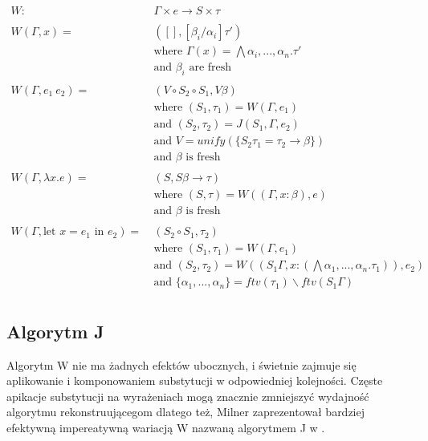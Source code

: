 \documentclass{article}
\begin{document}
\begin{equation}
  \begin{split}
    W :&\ \Gamma\times e \rightarrow S\times\tau \\
    \\
    W(\Gamma,x) =&\  ([],[\beta_i/\alpha_i]\tau') \\
    &\ \text{where } \Gamma(x) = \bigwedge\alpha_i,...,\alpha_n.\tau' \\
    &\ \text{and } \beta_i \text{ are fresh} \\
    \\
    W(\Gamma,e_1\ e_2) =&\  (V\circ S_2\circ S_1,V\beta) \\
    &\ \text{where } (S_1,\tau_1) = W(\Gamma,e_1) \\
    &\ \text{and } (S_2,\tau_2)=J(S_1,\Gamma,e_2) \\
    &\ \text{and } V = unify(\{S_2\tau_1=\tau_2\rightarrow\beta\}) \\
    &\ \text{and } \beta \text{ is fresh} \\
    \\
    W(\Gamma,\lambda x.e) =&\  (S,S\beta\rightarrow\tau) \\
    &\ \text{where } (S,\tau)=W((\Gamma,x:\beta),e) \\
    &\ \text{and } \beta \text{ is fresh} \\
    \\
    W(\Gamma,\text{let }x=e_1\text{ in }e_2) =&\  (S_2\circ S_1,\tau_2) \\
    &\ \text{where } (S_1,\tau_1)=W(\Gamma,e_1) \\
    &\ \text{and } (S_2,\tau_2)=W((S_1\Gamma,x:(\bigwedge\alpha_1,...,\alpha_n.\tau_1)),e_2) \\
    &\ \text{and } \{\alpha_1,...,\alpha_n\}=ftv(\tau_1)\backslash ftv(S_1\Gamma) \\
  \end{split}
\end{equation}

\subsection{Algorytm J}
Algorytm W nie ma żadnych efektów ubocznych, i świetnie zajmuje się aplikowanie i komponowaniem substytucji w odpowiedniej kolejności. Częste apikacje substytucji na wyrażeniach mogą znacznie zmniejszyć wydajność algorytmu rekonstruującegom dlatego też, Milner zaprezentował bardziej efektywną impereatywną wariacją W nazwaną algorytmem J w \cite{Milner__1978}.
\end{document}
